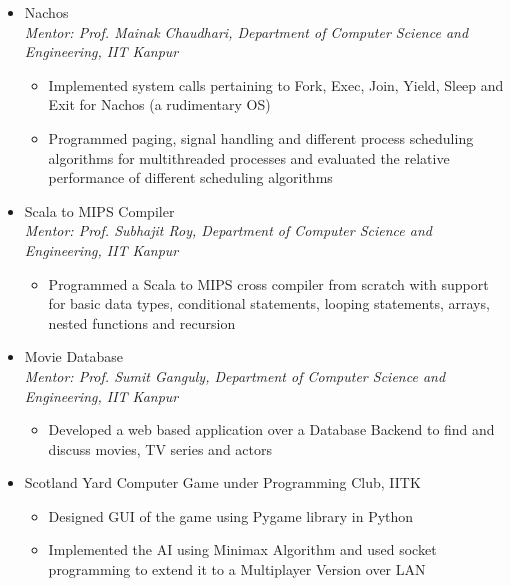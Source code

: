 \documentclass{article}
\begin{document}
\begin{itemize}[leftmargin=0.07cm]
\item[] {\large Nachos}\hspace*{\fill}\\
\emph{Mentor: Prof. Mainak Chaudhari, Department of Computer Science and Engineering, IIT Kanpur
}	\begin{itemize}
	\item Implemented system calls pertaining to Fork, Exec, Join, Yield, Sleep and Exit for Nachos (a rudimentary OS)
	\item Programmed paging, signal handling and different process scheduling algorithms for multithreaded processes and evaluated the relative performance of different scheduling algorithms
	\end{itemize}
\item[] {\large Scala to MIPS Compiler}\hspace*{\fill}\\
\emph{Mentor: Prof. Subhajit Roy, Department of Computer Science and Engineering, IIT Kanpur
}	\begin{itemize}
	\item Programmed a Scala to MIPS cross compiler from scratch with support for basic data types, conditional statements, looping statements, arrays, nested functions and recursion
	\end{itemize}
	
\item[] {\large Movie Database}\hspace*{\fill}\\
\emph{Mentor: Prof. Sumit Ganguly, Department of Computer Science and Engineering, IIT Kanpur
}	\begin{itemize}
	\item Developed a web based application over a Database Backend to find and discuss movies, TV series and actors
	\end{itemize}

\item[] {\large Scotland Yard Computer Game under} {\large Programming Club, IITK}\hspace*{\fill}
	\begin{itemize}
	\item Designed GUI of the game using Pygame library in Python
	\item Implemented the AI using Minimax Algorithm and used socket programming to extend it to a Multiplayer Version over LAN
	\end{itemize}
	\end{itemize}
\end{document}
